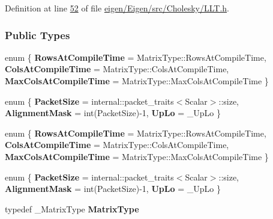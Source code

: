 Definition at line \hyperlink{eigen_2_eigen_2src_2_cholesky_2_l_l_t_8h_source_l00052}{52} of file \hyperlink{eigen_2_eigen_2src_2_cholesky_2_l_l_t_8h_source}{eigen/\+Eigen/src/\+Cholesky/\+L\+L\+T.\+h}.

\subsubsection*{Public Types}
\begin{DoxyCompactItemize}
\item 
\mbox{\label{group___cholesky___module_a8f3195b486d3e429b985fed16bab5396}} 
enum \{ {\bfseries Rows\+At\+Compile\+Time} = Matrix\+Type\+:\+:Rows\+At\+Compile\+Time, 
{\bfseries Cols\+At\+Compile\+Time} = Matrix\+Type\+:\+:Cols\+At\+Compile\+Time, 
{\bfseries Max\+Cols\+At\+Compile\+Time} = Matrix\+Type\+:\+:Max\+Cols\+At\+Compile\+Time
 \}
\item 
\mbox{\label{group___cholesky___module_a99b8b82109348987edfe04f63cfda2c8}} 
enum \{ {\bfseries Packet\+Size} = internal\+:\+:packet\+\_\+traits$<$Scalar$>$\+:\+:size, 
{\bfseries Alignment\+Mask} = int(Packet\+Size)-\/1, 
{\bfseries Up\+Lo} = \+\_\+\+Up\+Lo
 \}
\item 
\mbox{\label{group___cholesky___module_af557aa3cf02cbd6d774c43a06611aff7}} 
enum \{ {\bfseries Rows\+At\+Compile\+Time} = Matrix\+Type\+:\+:Rows\+At\+Compile\+Time, 
{\bfseries Cols\+At\+Compile\+Time} = Matrix\+Type\+:\+:Cols\+At\+Compile\+Time, 
{\bfseries Max\+Cols\+At\+Compile\+Time} = Matrix\+Type\+:\+:Max\+Cols\+At\+Compile\+Time
 \}
\item 
\mbox{\label{group___cholesky___module_af7873ec5a01ed81efba630d0eecb5845}} 
enum \{ {\bfseries Packet\+Size} = internal\+:\+:packet\+\_\+traits$<$Scalar$>$\+:\+:size, 
{\bfseries Alignment\+Mask} = int(Packet\+Size)-\/1, 
{\bfseries Up\+Lo} = \+\_\+\+Up\+Lo
 \}
\item 
\mbox{\label{group___cholesky___module_a51ef18ef9163d74028f6cb6d967a9242}} 
typedef \+\_\+\+Matrix\+Type {\bfseries Matrix\+Type}
\item 
\mbox{\label{group___cholesky___module_ac3e9cca0fd73cbe446f5ee562386a934}} 

\end{DoxyCompactItemize}
